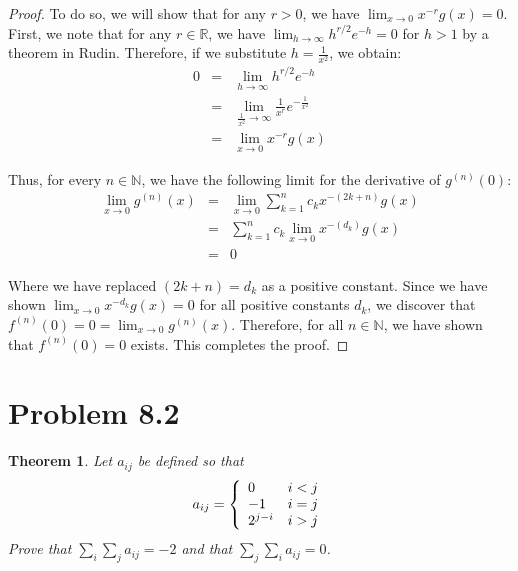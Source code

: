 \documentclass[psamsfonts]{amsart}
\newtheorem{thm}{Theorem}[section]
\theoremstyle{definition}
\theoremstyle{remark}
\numberwithin{equation}{section}
\begin{document}
\begin{proof}
To do so, we will show that for any $r > 0$, we have $\lim_{x \to 0} x^{-r} g(x) = 0$. First, we note that for any $r \in \mathbb{R}$, we have $\lim_{h \to \infty} h^{r/2} e^{-h} = 0$ for $h > 1$ by a theorem in Rudin. Therefore, if we substitute $h = \frac{1}{x^2}$, we obtain:
\begin{eqnarray}
0 &=& \lim_{h \to \infty} h^{r/2} e^{-h} \\
&=&  \lim_{\frac{1}{x^2} \to \infty} \frac{1}{x^r} e^{-\frac{1}{x^2}} \\
&=& \lim_{x \to 0} x^{-r} g(x)
\end{eqnarray}

Thus, for every $n \in \mathbb{N}$, we have the following limit for the derivative of $g^{(n)}(0)$: 
\begin{eqnarray}
\lim_{x \to 0} g^{(n)}(x) &=& \lim_{x \to 0}  \sum_{k=1}^n c_k x^{-(2k + n)} g(x) \\
&=& \sum_{k=1}^n c_k \lim_{x \to 0} x^{-(d_k)} g(x) \\
&=& 0
\end{eqnarray}

Where we have replaced $(2k+n) = d_k$ as a positive constant. Since we have shown $\lim_{x \to 0} x^{-d_k} g(x) = 0$ for all positive constants $d_k$, we discover that $f^{(n)} (0) = 0 = \lim_{x \to 0} g^{(n)}(x)$. Therefore, for all $n \in \mathbb{N}$, we have shown that $f^{(n)}(0) = 0$ exists. This completes the proof.
\end{proof}

\section{Problem 8.2}

\begin{thm}
Let $a_{ij}$ be defined so that
\begin{equation}
a_{ij} = \left\{ \begin{array}{l l}
0 & i < j \\
-1 & i = j \\
2^{j-i} &  i > j \end{array} \right. 
\end{equation}
Prove that $\sum_i \sum_j a_{ij} = -2$ and that $\sum_{j} \sum_i a_{ij} = 0$. 
\end{thm}
\end{document}
